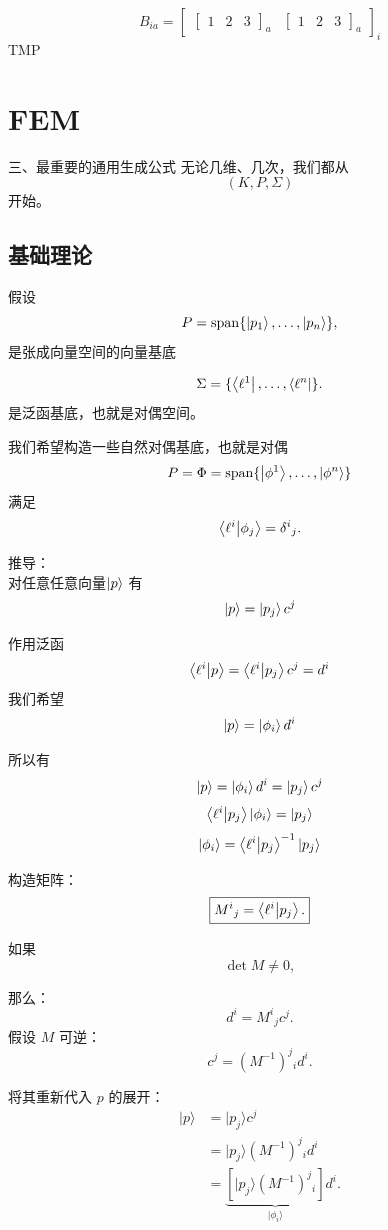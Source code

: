 \[
    B_{ia}=\left[\begin{array}{cc}
            \left[\begin{array}{lll}
                          1 &
                          2 &
                          3
                      \end{array}\right]_{a}
             &
            \left[\begin{array}{lll}
                          1 &
                          2 &
                          3
                      \end{array}\right]_{a}
        \end{array}\right]_{i}
\]
TMP




\section{FEM}
三、最重要的通用生成公式
无论几维、几次，我们都从
\[
    (K,P,\Sigma)
\]
开始。


\subsection{基础理论}
假设
\[
    P=\operatorname{span}\{\ket{p_1},\ldots,\left| p_n \right\rangle\},
\]
是张成向量空间的向量基底

\[
    \Sigma=\{\bra{\ell^1} ,\ldots,\left\langle \ell^n \right|\}.
\]
是泛函基底，也就是对偶空间。

我们希望构造一些自然对偶基底，也就是对偶
\[
    P=\Phi=\operatorname{span}\{\ket{\phi^1},\ldots,\ket{\phi^n}\}
\]
满足
\[
    \braket{\ell^i}{\phi_j}=\delta^{i}{}_{j}.
\]

推导：\\
对任意任意向量\(\ket{p}\)
有
\[
    \ket{p}=\ket{p_j}c^j
\]

作用泛函
\[
    \braket{\ell^i}{p}=\braket{\ell^i}{p_j}c^j=d^i
\]
我们希望
\[
    \ket{p}=\ket{\phi_i}d^i
\]

所以有
\[
    \ket{p}=\ket{\phi_i}d^i=\ket{p_j}c^j
\]
\[
    \braket{\ell^i}{p_j}\ket{\phi_i}=\ket{p_j}
\]
\[
    \ket{\phi_i}=\braket{\ell^i}{p_j}^{-1}\ket{p_j}
\]

构造矩阵：
\[
    \boxed{M^{i}{}_{j}=\braket{\ell^i}{p_j}.}
\]

如果
\[
    \det M\ne0,
\]

那么：
\[
    d^i=M^i{}_jc^j.
\]
假设 \(M\) 可逆：
\[
    \boxed{
    c^j=(M^{-1})^j{}_id^i.
    }
\]

将其重新代入 \(p\) 的展开：
\[
    \begin{aligned}
        |p\rangle
         & =|p_j\rangle c^j              \\
         & =|p_j\rangle(M^{-1})^j{}_id^i \\
         & =\underbrace{
        \left[|p_j\rangle(M^{-1})^j{}_i\right]
        }_{|\phi_i\rangle}d^i.
    \end{aligned}
\]

